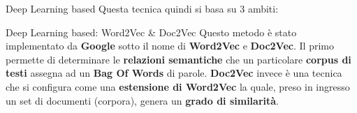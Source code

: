 \documentclass[british]{beamer}
\begin{document}
\begin{frame}{Deep Learning based}
	Questa tecnica quindi si basa su 3 ambiti:
	\begin{figure}[!hf]
		\centering
	\end{figure}
\end{frame}
	
\begin{frame}{Deep Learning based: Word2Vec \& Doc2Vec}
	Questo metodo \`{e} stato implementato da \textbf{Google} sotto il nome di \textbf{Word2Vec} e \textbf{Doc2Vec}.
	Il primo permette di determinare le \textbf{relazioni semantiche} che un particolare \textbf{corpus di testi} assegna ad un \textbf{Bag Of Words} di parole.
	\textbf{Doc2Vec} invece \`{e} una tecnica che si configura come una \textbf{estensione di Word2Vec} la quale, preso in ingresso un set di documenti (corpora), genera un \textbf{grado di similarit\`{a}}.
\end{frame}
\end{document}
